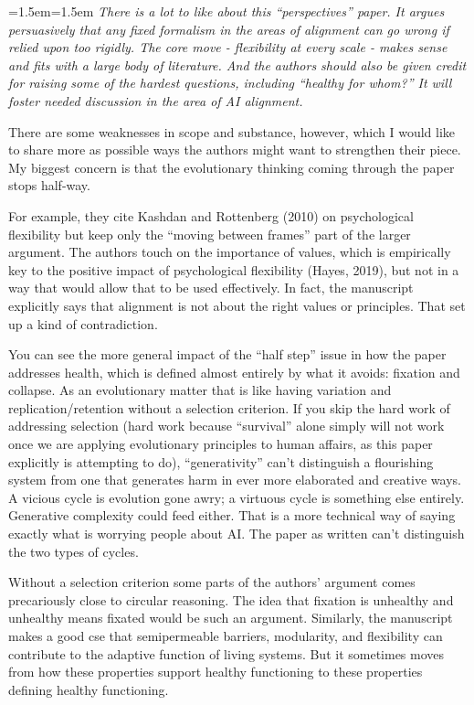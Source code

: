 \documentclass[fontsize=11.5pt]{scrartcl}
\newenvironment{reviewernote}
  {\par\medskip\begingroup\leftskip=1.5em\rightskip=1.5em\itshape\color{reviewercolor}}
  {\par\endgroup\medskip}
\begin{document}
\begin{reviewernote}
There is a lot to like about this ``perspectives'' paper. It argues persuasively that any fixed formalism in the areas of alignment can go wrong if relied upon too rigidly. The core move - flexibility at every scale - makes sense and fits with a large body of literature. And the authors should also be given credit for raising some of the hardest questions, including ``healthy for whom?'' It will foster needed discussion in the area of AI alignment.

There are some weaknesses in scope and substance, however, which I would like to share more as possible ways the authors might want to strengthen their piece. My biggest concern is that the evolutionary thinking coming through the paper stops half-way.

For example, they cite Kashdan and Rottenberg (2010) on psychological flexibility but keep only the ``moving between frames'' part of the larger argument. The authors touch on the importance of values, which is empirically key to the positive impact of psychological flexibility (Hayes, 2019), but not in a way that would allow that to be used effectively. In fact, the manuscript explicitly says that alignment is not about the right values or principles. That set up a kind of contradiction.

You can see the more general impact of the ``half step'' issue in how the paper addresses health, which is defined almost entirely by what it avoids: fixation and collapse. As an evolutionary matter that is like having variation and replication/retention without a selection criterion. If you skip the hard work of addressing selection (hard work because ``survival'' alone simply will not work once we are applying evolutionary principles to human affairs, as this paper explicitly is attempting to do), ``generativity'' can't distinguish a flourishing system from one that generates harm in ever more elaborated and creative ways. A vicious cycle is evolution gone awry; a virtuous cycle is something else entirely. Generative complexity could feed either. That is a more technical way of saying exactly what is worrying people about AI. The paper as written can't distinguish the two types of cycles.

Without a selection criterion some parts of the authors' argument comes precariously close to circular reasoning. The idea that fixation is unhealthy and unhealthy means fixated would be such an argument. Similarly, the manuscript makes a good cse that semipermeable barriers, modularity, and flexibility can contribute to the adaptive function of living systems. But it sometimes moves from how these properties support healthy functioning to these properties defining healthy functioning.


\end{reviewernote}
\end{document}
